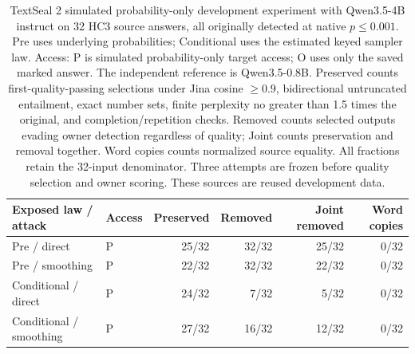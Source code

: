 \begin{table}[ht]\centering\small
\begin{tabular}{llrrrr}\toprule
Exposed law / attack & Access & Preserved & Removed & Joint removed & Word copies\\\midrule
Pre / direct & P & 25/32 & 32/32 & 25/32 & 0/32\\
Pre / smoothing & P & 22/32 & 32/32 & 22/32 & 0/32\\
Conditional / direct & P & 24/32 & 7/32 & 5/32 & 0/32\\
Conditional / smoothing & P & 27/32 & 16/32 & 12/32 & 0/32\\
\bottomrule\end{tabular}
\caption{TextSeal 2 simulated probability-only development experiment with Qwen3.5-4B instruct on 32 HC3 source answers, all originally detected at native $p\leq0.001$. Pre uses underlying probabilities; Conditional uses the estimated keyed sampler law. Access: P is simulated probability-only target access; O uses only the saved marked answer. The independent reference is Qwen3.5-0.8B. Preserved counts first-quality-passing selections under Jina cosine $\geq0.9$, bidirectional untruncated entailment, exact number sets, finite perplexity no greater than 1.5 times the original, and completion/repetition checks. Removed counts selected outputs evading owner detection regardless of quality; Joint counts preservation and removal together. Word copies counts normalized source equality. All fractions retain the 32-input denominator. Three attempts are frozen before quality selection and owner scoring. These sources are reused development data.}\end{table}
